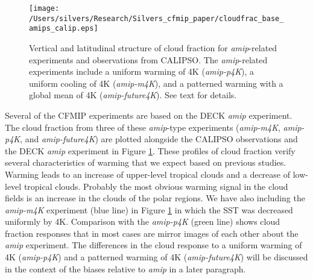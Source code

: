 \documentclass[draft]{agujournal2019}
\begin{document}
\begin{figure}
  \centering
  \texttt{[image: /Users/silvers/Research/Silvers\_cfmip\_paper/cloudfrac\_base\_amips\_calip.eps]}
  \caption{Vertical and latitudinal structure of cloud fraction for \textit{amip}-related experiments and observations from 
  CALIPSO.  The \textit{amip}-related experiments include a uniform warming of 4K (\textit{amip-p4K}), 
  a uniform cooling of 4K (\textit{amip-m4K}), and a 
  patterned warming with a global mean of 4K (\textit{amip-future4K}).  See text for details.}
  \label{fig:calipso_amip_comparison}
\end{figure}


Several of the CFMIP experiments are based on the DECK \textit{amip} experiment.  The cloud fraction from three 
of these \textit{amip}-type experiments (\textit{amip-m4K}, \textit{amip-p4K}, and \textit{amip-future4K}) 
are plotted alongside the CALIPSO observations and the DECK 
\textit{amip} experiment in Figure \ref{fig:calipso_amip_comparison}.  These profiles of cloud fraction verify
several characteristics of warming that we expect based on previous studies.  Warming leads to 
an increase of upper-level tropical clouds and a decrease of low-level tropical clouds.  Probably the most 
obvious warming signal in the cloud fields is an increase in the clouds of the polar regions.  We have also 
including the \textit{amip-m4K} experiment (blue line) in Figure \ref{fig:calipso_amip_comparison} in which the 
SST was decreased uniformly by 4K.  Comparison
with the \textit{amip-p4K} (green line) shows cloud fraction responses that in most cases are mirror images
of each other about the \textit{amip} experiment.   The differences in the cloud response to a uniform warming
of 4K (\textit{amip-p4K}) and a patterned warming of 4K (\textit{amip-future4K}) will be discussed in the 
context of the biases relative to \textit{amip} in a later paragraph.
\end{document}
